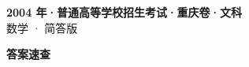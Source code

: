 \documentclass[zihao=-4, a4paper]{ctexart}
\begin{document}
\begin{center}
  {\Large\bfseries 2004 年·普通高等学校招生考试·重庆卷·文科}\\[4pt]
  {\large 数学 · 简答版}
\end{center}
\medskip
{}

\clearpage
{}
\begin{center}{\Large\bfseries 答案速查}\end{center}
\medskip

\end{document}
